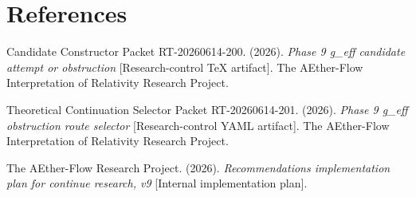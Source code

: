 \documentclass[11pt]{article}
\begin{document}
\section*{References}

Candidate Constructor Packet RT-20260614-200. (2026).
\textit{Phase 9 g\_eff candidate attempt or obstruction}
[Research-control TeX artifact]. The AEther-Flow Interpretation of Relativity
Research Project.

Theoretical Continuation Selector Packet RT-20260614-201. (2026).
\textit{Phase 9 g\_eff obstruction route selector}
[Research-control YAML artifact]. The AEther-Flow Interpretation of Relativity
Research Project.

The AEther-Flow Research Project. (2026). \textit{Recommendations
implementation plan for continue research, v9} [Internal implementation plan].
\end{document}
